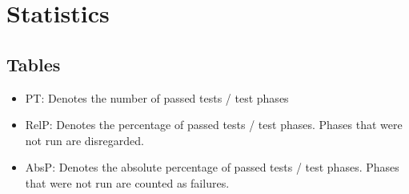 \documentclass{article}
\begin{document}
\section{Statistics}\subsection{Tables}
\begin{itemize}
            \item PT: Denotes the number of passed tests / test phases
            \item RelP: Denotes the percentage of passed tests / test phases. Phases that were not run are disregarded.
            \item AbsP: Denotes the absolute percentage of passed tests / test phases. Phases that were not run are counted as failures.
            \end{itemize}
\end{document}
